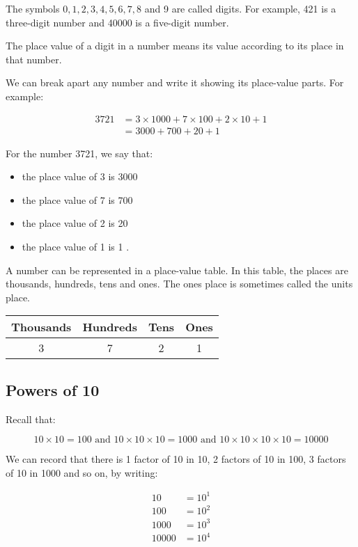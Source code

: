 The symbols \(0,1,2,3,4,5,6,7,8\) and 9 are called digits. For example, 421 is a three-digit number and 40000 is a five-digit number.

The place value of a digit in a number means its value according to its place in that number.

We can break apart any number and write it showing its place-value parts. For example:

\[
\begin{aligned}
3721 & =3 \times 1000+7 \times 100+2 \times 10+1 \\
& =3000+700+20+1
\end{aligned}
\]

For the number 3721, we say that:

\begin{itemize}
  \item the place value of 3 is 3000
  \item the place value of 7 is 700
  \item the place value of 2 is 20
  \item the place value of 1 is 1 .
\end{itemize}

A number can be represented in a place-value table. In this table, the places are thousands, hundreds, tens and ones. The ones place is sometimes called the units place.

\begin{center}
\begin{tabular}{|c|c|c|c|}
\hline
Thousands & Hundreds & Tens & Ones \\
\hline
3 & 7 & 2 & 1 \\
\hline
\end{tabular}
\end{center}

\subsection{Powers of 10}
Recall that:

\[
10 \times 10=100 \text { and } 10 \times 10 \times 10=1000 \text { and } 10 \times 10 \times 10 \times 10=10000
\]

We can record that there is 1 factor of 10 in 10, 2 factors of 10 in 100, 3 factors of 10 in 1000 and so on, by writing:

\[
\begin{aligned}
10 & =10^{1} \\
100 & =10^{2} \\
1000 & =10^{3} \\
10000 & =10^{4}
\end{aligned}
\]

